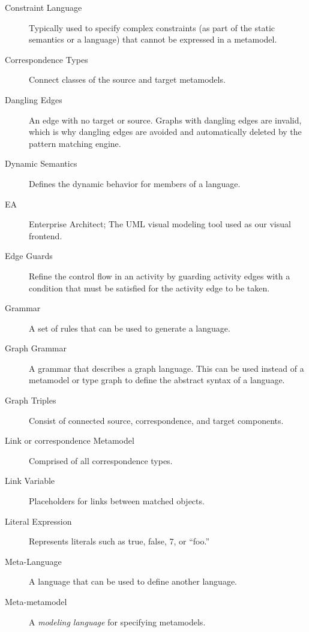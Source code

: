 \begin{description}
\item[Constraint Language] 
Typically used to specify complex constraints (as part of the static semantics or a language) that cannot be expressed in a metamodel.

\item[Correspondence Types] 
Connect classes of the source and target metamodels.

\item[Dangling Edges]
An edge with no target or source. Graphs with dangling edges are invalid, which is why dangling edges are avoided and automatically deleted by the pattern
matching engine.

\item[Dynamic Semantics] 
Defines the dynamic behavior for members of a language.

\item[EA]
Enterprise Architect; The UML visual modeling tool used as our visual frontend.

\item[Edge Guards]
Refine the control flow in an activity by guarding activity edges with a condition that must be satisfied for the activity edge to be taken.

\item[Grammar] 
A set of rules that can be used to generate a language. 

\item[Graph Grammar] 
A grammar that describes a graph language. This can be used instead of a metamodel or type graph to define the abstract syntax of a language.

\item[Graph Triples] 
Consist of connected source, correspondence, and target components.

\item[Link or correspondence Metamodel] 
Comprised of all correspondence types.

\item[Link Variable]
Placeholders for links between matched objects.

\item[Literal Expression]
Represents literals such as true, false, 7, or ``foo.''

\item[Meta-Language] 
A language that can be used to define another language.

\item[Meta-metamodel] 
A \emph{modeling language} for specifying metamodels.


\end{description}
